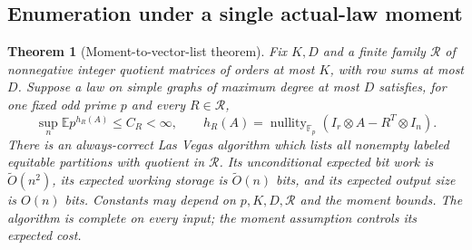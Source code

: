 \documentclass[11pt]{article}
\newtheorem{theorem}{Theorem}[section]
\theoremstyle{definition}
\theoremstyle{remark}
\newcommand{\E}{\mathbb E}
\newcommand{\1}{\mathbf 1}
\providecommand{\Fp}{\mathbb F_p}
\providecommand{\nullity}{\operatorname{nullity}}
\begin{document}
\subsection{Enumeration under a single actual-law moment}
\begin{theorem}[Moment-to-vector-list theorem]\label{rec:vec:thm:moment}
Fix $K,D$ and a finite family $\mathcal R$ of nonnegative integer
quotient matrices of orders at most $K$, with row sums at most $D$.
Suppose a law on simple graphs of maximum degree at most $D$ satisfies,
for one fixed odd prime $p$ and every $R\in\mathcal R$,
\begin{equation}\label{rec:eq:vector-moment}
 \sup_n\E p^{h_R(A)}\le C_R<\infty,\qquad
 h_R(A)=\nullity_{\Fp}(I_r\otimes A-R^T\otimes I_n).
\end{equation}
There is an always-correct Las Vegas algorithm which lists all
nonempty labeled equitable partitions with quotient in $\mathcal R$.
Its unconditional expected bit work is $\widetilde O(n^2)$, its
expected working storage is $\widetilde O(n)$ bits, and its expected
output size is $O(n)$ bits. Constants may depend on
$p,K,D,\mathcal R$ and the moment bounds. The algorithm is complete
on every input; the moment assumption controls its expected cost.
\end{theorem}
\end{document}
